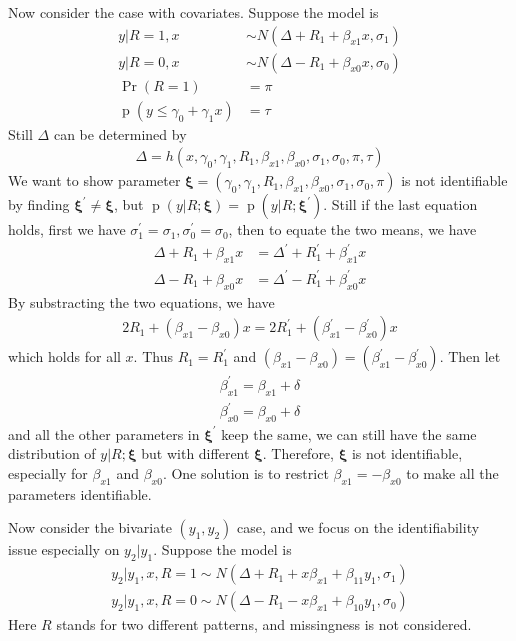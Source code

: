 \documentclass[12pt]{article}
\DeclareMathOperator{\pr}{p}
\DeclareMathOperator{\prob}{Pr}
\begin{document}
Now consider the case with covariates. Suppose the model is
\begin{align*}
  y | R = 1, x & \sim N(\Delta + R_1 + \beta_{x1} x , \sigma_1) \\
  y | R = 0, x & \sim N(\Delta - R_1 + \beta_{x0} x, \sigma_0) \\
  \prob (R = 1) & = \pi \\
  \pr (y \leq \gamma_0 + \gamma_1 x ) & = \tau
\end{align*}
Still $\Delta$ can be determined by
\begin{align*}
  \Delta = h(x, \gamma_0, \gamma_1, R_1, \beta_{x1}, \beta_{x0}, \sigma_1, \sigma_0, \pi , \tau)
\end{align*}
We want to show parameter $\bm \xi = (\gamma_0, \gamma_1, R_1, \beta_{x1}, \beta_{x0}, \sigma_1,
\sigma_0, \pi )$ is not identifiable by finding $\bm \xi^{'} \neq \bm
\xi$, but $\pr (y | R; \bm \xi) = \pr (y | R; \bm \xi^{'})$. Still if
the last equation holds, first we have $\sigma_1^{'} = \sigma_1, \sigma_0^{'} = \sigma_0$,
then to equate the two means, we have
\begin{align*}
  \Delta + R_1 + \beta_{x1} x & = \Delta^{'} + R_1^{'} + \beta_{x1}^{'}x \\
  \Delta - R_1 + \beta_{x0} x & = \Delta^{'} - R_1^{'} + \beta_{x0}^{'}x
\end{align*}
By substracting the two equations, we have
\begin{align*}
  2R_1 + (\beta_{x1} - \beta_{x0}) x = 2R_1^{'} + (\beta_{x1}^{'} -
  \beta_{x0}^{'}) x
\end{align*}
which holds for all $x$. Thus $R_1 = R_1^{'}$ and $(\beta_{x1} - \beta_{x0}) =
(\beta_{x1}^{'} - \beta_{x0}^{'})$. Then let
\begin{align*}
  \beta_{x1}^{'} =  \beta_{x1} + \delta\\
  \beta_{x0}^{'} = \beta_{x0} + \delta
\end{align*}
and all the other parameters in $\bm \xi^{'}$ keep the same, we can
still have the same distribution of $y|R; \bm \xi$ but with different
$\bm \xi$. Therefore, $\bm \xi$ is not identifiable, especially for
$\beta_{x1} $ and $\beta_{x0}$. One solution is to restrict $\beta_{x1} =
- \beta_{x0}$ to make all the parameters identifiable.

Now consider the bivariate $(y_1, y_2)$ case, and we focus on the
identifiability issue especially on $y_2|y_1$. Suppose the model is
\begin{align*}
  y_2 | y_1, x, R = 1 \sim N(\Delta + R_1 + x\beta_{x1} + \beta_{11}y_1, \sigma_1) \\
  y_2 | y_1, x, R = 0 \sim N(\Delta - R_1 - x\beta_{x1} + \beta_{10}y_1, \sigma_0)
\end{align*} 
Here $R$ stands for two different patterns, and missingness is not considered.
\end{document}
